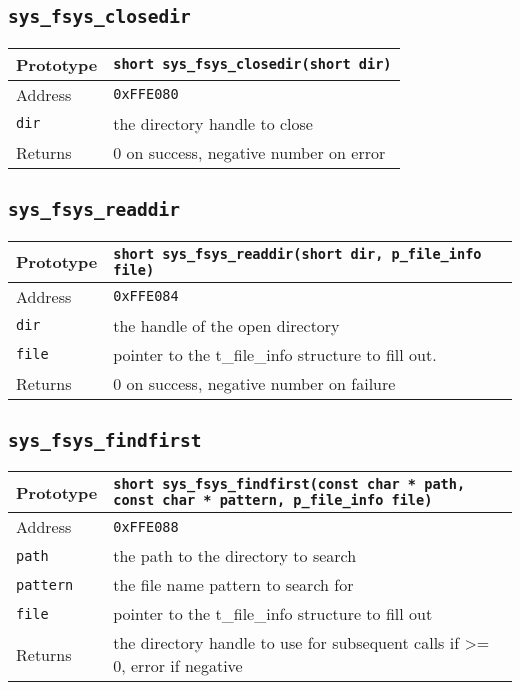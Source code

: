 \subsection*{\texttt{sys\_fsys\_closedir}}
\begin{tabular}{|l||l|} \hline
Prototype & \lstinline!short sys_fsys_closedir(short dir)! \\ \hline
Address & \texttt{0xFFE080} \\ \hline
\lstinline!dir! & the directory handle to close \\ \hline
Returns & 0 on success, negative number on error \\ \hline
\end{tabular}

\subsection*{\texttt{sys\_fsys\_readdir}}
\begin{tabular}{|l||l|} \hline
Prototype & \lstinline!short sys_fsys_readdir(short dir, p_file_info file)! \\ \hline
Address & \texttt{0xFFE084} \\ \hline
\lstinline!dir! & the handle of the open directory \\ \hline
\lstinline!file! & pointer to the t\_file\_info structure to fill out. \\ \hline
Returns & 0 on success, negative number on failure \\ \hline
\end{tabular}

\subsection*{\texttt{sys\_fsys\_findfirst}}
\begin{tabular}{|l||l|} \hline
Prototype & \lstinline!short sys_fsys_findfirst(const char * path, const char * pattern, p_file_info file)! \\ \hline
Address & \texttt{0xFFE088} \\ \hline
\lstinline!path! & the path to the directory to search \\ \hline
\lstinline!pattern! & the file name pattern to search for \\ \hline
\lstinline!file! & pointer to the t\_file\_info structure to fill out \\ \hline
Returns & the directory handle to use for subsequent calls if >= 0, error if negative \\ \hline
\end{tabular}

